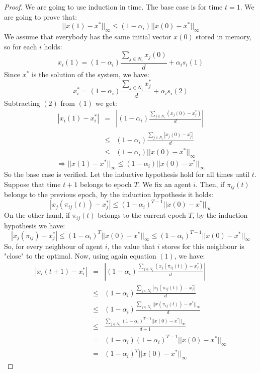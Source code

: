 \begin{proof}
We are going to use induction in time. The base case is for time $t=1$. We are going to prove that: $$ ||x(1)-x^*||_{\infty} \leq (1-\alpha_i)||x(0)-x^*||_{\infty}$$
We assume that everybody has the same initial vector $x(0)$ stored in memory, so for each $i$ holds:
$$x_i(1) = (1-\alpha_i)\frac{\sum_{j \in N_i}x_j(0)}{d}+\alpha_i s_i (1)$$Since $x^*$ is the solution of the system, we have:
$$ x_i^* = (1-\alpha_i)\frac{\sum_{j \in N_i}x_j^*}{d}+\alpha_i s_i (2)$$
Subtracting $(2)$ from $(1)$ we get:
\begin{eqnarray*}
|x_i(1) - x_i^*| &=& |(1-\alpha_i)\frac{\sum_{j \in N_i}(x_j(0)-x_j^*)}{d}|\\
&\leq& (1-\alpha_i)\frac{\sum_{j \in N_i}|x_j(0)-x_j^*|}{d} \\
&\leq& (1-\alpha_i) ||x(0)-x^*||_{\infty}
\end{eqnarray*}
$$ \Rightarrow ||x(1)-x^*||_{\infty} \leq (1-\alpha_i)||x(0)-x^*||_{\infty}$$
So the base case is verified. Let the inductive hypothesis hold for all times until $t$. Suppose that time $t+1$ belongs to epoch $T$. We fix an agent $i$. Then, if $\pi_{ij}(t)$ belongs to the previous epoch, by the induction hypothesis it holds:
$$ |x_j(\pi_{ij}(t)) - x_j^*| \leq \left( 1-\alpha_i\right)^{T-1}||x(0)-x^*||_{\infty}$$
 On the other hand, if $\pi_{ij}(t)$ belongs to the current epoch $T$, by the induction hypothesis we have:
 $$ |x_j(\pi_{ij}) - x_j^*| \leq \left( 1-\alpha_i\right)^{T}||x(0)-x^*||_{\infty} \leq \left( 1-\alpha_i\right)^{T-1}||x(0)-x^*||_{\infty}$$
 So, for every neighbour of agent $i$, the value that $i$ stores for this neighbour is "close" to the optimal. Now, using again equation $(1)$, we have:
 \begin{eqnarray*}
|x_i(t+1) - x_i^*| &=& |(1-\alpha_i)\frac{\sum_{j \in N_i}(x_j(\pi_{ij}(t))-x_j^*)}{d}|\\
&\leq& (1-\alpha_i)\frac{\sum_{j \in N_i}|x_j(\pi_{ij}(t))-x_j^*|}{d}\\
&\leq& (1-\alpha_i)\frac{\sum_{j \in N_i}||x(\pi_{ij}(t))-x^*||_\infty}{d}\\
&\leq& \frac{\sum_{j \in N_i}\left(1-\alpha_i\right)^{T-1}||x(0)-x^*||_{\infty}}{d+1}\\
&=& (1-\alpha_i)\left(1-\alpha_i\right)^{T-1}||x(0)-x^*||_{\infty}\\
&=& \left(1-\alpha_i\right)^{T}||x(0)-x^*||_{\infty}
 \end{eqnarray*}

\end{proof}

